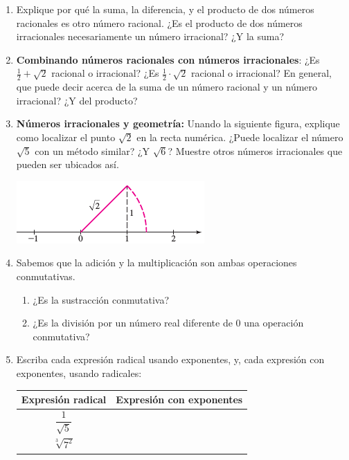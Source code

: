 \documentclass[10pt,letter,twoside]{article}
\begin{document}
\begin{multicols}{2}
\begin{enumerate}
\begin{enumerate}
\end{enumerate}
\item Explique por qué la suma, la diferencia, y el producto de dos números racionales es otro número racional. ¿Es el producto de dos números irracionales necesariamente un número irracional? ¿Y la suma?
\item \textbf{Combinando n\'{u}meros racionales con n\'umeros irracionales}: ¿Es $\frac{1}{2}+\sqrt{2}$ racional o irracional? ¿Es $\frac{1}{2}\cdot \sqrt{2}$ racional o irracional?
 En general, que puede decir acerca de la suma de un n\'umero racional y un n\'umero irracional? ¿Y del producto?
 \item \textbf{Números irracionales y geometría:} Unando la siguiente figura, explique como localizar el punto $\sqrt{2}$ en la recta numérica. ¿Puede localizar el número $\sqrt{5}$ con un método similar? ¿Y $\sqrt{6}$? Muestre otros números irracionales que pueden ser ubicados así.
 \begin{center}
 \includegraphics{./Images/raizde2.png}
\end{center}
\item Sabemos que la adición y la multiplicación son ambas operaciones conmutativas.
\begin{enumerate}
 \item ¿Es la sustracción conmutativa?
 \item ¿Es la división por un número real diferente de 0 una operación conmutativa?
\end{enumerate}
\item Escriba cada expresión radical usando exponentes, y, cada expresión con exponentes, usando radicales:
\begin{center}
\begin{tabular}{|c|c|}\hline
Expresión radical & Expresión con exponentes\\ \hline
$\dfrac{1}{\sqrt{5}}$ & \rule[-0.3cm]{0cm}{0.8cm}\\ \hline
$\sqrt[3]{7^{2}}$ & \rule[-0.3cm]{0cm}{0.8cm}\\ \hline

\end{tabular}
\end{center}
\end{enumerate}
\end{multicols}
\end{document}
